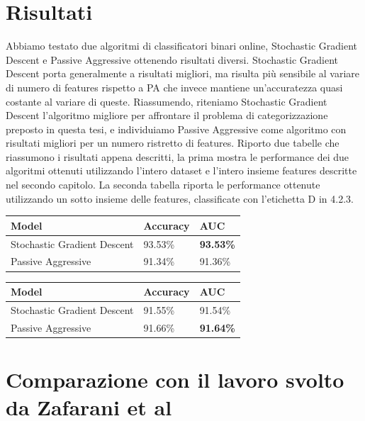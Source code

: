 \section{Risultati}

Abbiamo testato due algoritmi di classificatori binari online, Stochastic Gradient Descent e Passive Aggressive ottenendo risultati diversi. Stochastic Gradient Descent porta generalmente a risultati migliori, ma risulta più sensibile al variare di numero di features rispetto a PA che invece mantiene un'accuratezza quasi costante al variare di queste.\newline
Riassumendo, riteniamo Stochastic Gradient Descent l'algoritmo migliore per affrontare il problema di categorizzazione preposto in questa tesi, e individuiamo Passive Aggressive come algoritmo con risultati migliori per un numero ristretto di features.\newline
Riporto due tabelle che riassumono i risultati appena descritti, la prima mostra le performance dei due algoritmi ottenuti utilizzando l'intero dataset e l'intero insieme features descritte nel secondo capitolo. La seconda tabella riporta le performance ottenute utilizzando un sotto insieme delle features, classificate con l'etichetta D in 4.2.3. \newline

\begin{tabular}{ |l|l|l| }
	\hline
	\textbf{Model} & \textbf{Accuracy} & \textbf{AUC} \\ \hline
	Stochastic Gradient Descent & 93.53\% & \textbf{93.53\%} \\ \hline
	Passive Aggressive &  91.34\% & 91.36\% \\
	\hline
\end{tabular}
\newline\newline

\begin{tabular}{ |l|l|l| }
	\hline
	\textbf{Model} & \textbf{Accuracy} & \textbf{AUC} \\ \hline
	Stochastic Gradient Descent & 91.55\% & 91.54\% \\ \hline
	Passive Aggressive &  91.66\% & \textbf{91.64\%} \\
	\hline
\end{tabular}
\newline\newline

\section{Comparazione con il lavoro svolto da Zafarani et al}


